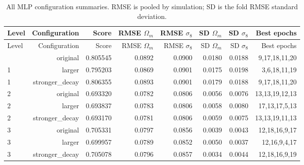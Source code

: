 \begingroup\footnotesize\setlength{\tabcolsep}{3pt}\renewcommand{\arraystretch}{1.05}
\begin{longtable}{lrrrrrrr}
\caption{All MLP configuration summaries. RMSE is pooled by simulation; SD is the fold RMSE standard deviation.}\label{tab:mlp-cv}\\
\toprule
Level & Configuration & Score & RMSE $\Omega_m$ & RMSE $\sigma_8$ & SD $\Omega_m$ & SD $\sigma_8$ & Best epochs \\
\midrule
\endfirsthead
\toprule
Level & Configuration & Score & RMSE $\Omega_m$ & RMSE $\sigma_8$ & SD $\Omega_m$ & SD $\sigma_8$ & Best epochs \\
\midrule\endhead
\bottomrule\endfoot
1 & original & 0.805545 & 0.0892 & 0.0900 & 0.0180 & 0.0188 & 9,17,18,11,20 \\
1 & larger & 0.795203 & 0.0869 & 0.0901 & 0.0175 & 0.0198 & 3,6,18,11,19 \\
1 & stronger\_decay & 0.806355 & 0.0893 & 0.0901 & 0.0179 & 0.0188 & 9,17,18,11,20 \\
2 & original & 0.693320 & 0.0782 & 0.0806 & 0.0056 & 0.0076 & 13,13,19,12,13 \\
2 & larger & 0.693837 & 0.0783 & 0.0806 & 0.0058 & 0.0080 & 17,13,17,5,13 \\
2 & stronger\_decay & 0.693170 & 0.0781 & 0.0806 & 0.0059 & 0.0075 & 13,13,19,11,13 \\
3 & original & 0.705331 & 0.0797 & 0.0856 & 0.0039 & 0.0043 & 12,18,16,9,17 \\
3 & larger & 0.699957 & 0.0789 & 0.0852 & 0.0050 & 0.0037 & 12,16,9,4,17 \\
3 & stronger\_decay & 0.705078 & 0.0796 & 0.0857 & 0.0034 & 0.0044 & 12,18,16,9,19 \\
\end{longtable}\endgroup
